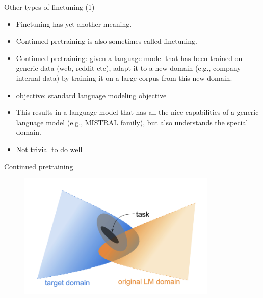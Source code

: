 

\begin{frame}{Other types of finetuning (1)}

\vfill

\begin{itemize}
    \item Finetuning has yet another meaning.
    \item Continued pretraining is also sometimes called
    finetuning.
    \item Continued pretraining: given a language model
that has been    trained on generic data (web, reddit etc),
    adapt it to a new domain (e.g., company-internal data) by
    training it on a large corpus from this new domain.
\item objective: standard language modeling objective
    \item This results in a language model that has all the
    nice capabilities of a generic language model (e.g.,
    MISTRAL family), but also understands the special domain.
\item Not trivial to do well
\end{itemize}

\vfill

\end{frame}

\begin{frame}{Continued pretraining}

\vfill
	
	\begin{figure}
		\centering
		\includegraphics[height = 6cm]{figure/continuedpretraining1} 
	\end{figure}

\vfill

\end{frame}


